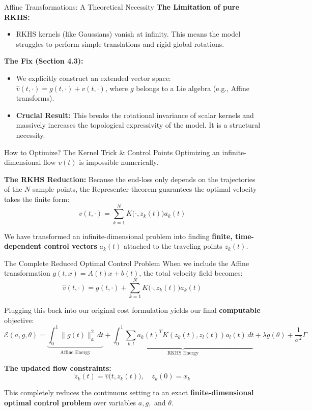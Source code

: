 \documentclass[aspectratio=169]{beamer}
\begin{document}
\begin{frame}{Affine Transformations: A Theoretical Necessity}
\textbf{The Limitation of pure RKHS:}
\begin{itemize}
  \item RKHS kernels (like Gaussians) vanish at infinity. This means the model struggles to perform simple translations and rigid global rotations.
\end{itemize}

\textbf{The Fix (Section 4.3):}
\begin{itemize}
  \item We explicitly construct an extended vector space: $\widehat{v}(t, \cdot) = g(t, \cdot) + v(t, \cdot)$, where $g$ belongs to a Lie algebra (e.g., Affine transforms).
  \item \textbf{Crucial Result:} This breaks the rotational invariance of scalar kernels and massively increases the topological expressivity of the model. It is a structural necessity.
\end{itemize}
\end{frame}



\begin{frame}{How to Optimize? The Kernel Trick \& Control Points}
Optimizing an infinite-dimensional flow $v(t)$ is impossible numerically.

\vspace{1mm}
\textbf{The RKHS Reduction:}
Because the end-loss only depends on the trajectories of the $N$ sample points, the Representer theorem guarantees the optimal velocity takes the finite form:
\[
v(t,\cdot)=\sum_{k=1}^{N} K\big(\cdot,z_k(t)\big) a_k(t)
\]

We have transformed an infinite-dimensional problem into finding \textbf{finite, time-dependent control vectors} $a_k(t)$ attached to the traveling points $z_k(t)$.
\end{frame}




\begin{frame}{The Complete Reduced Optimal Control Problem}
When we include the Affine transformation $g(t, x) = A(t)x + b(t)$, the total velocity field becomes:
\[
\widehat{v}(t,\cdot) = g(t,\cdot) + \sum_{k=1}^{N} K\big(\cdot,z_k(t)\big) a_k(t)
\]

Plugging this back into our original cost formulation yields our final \textbf{computable} objective:
\[
\mathcal{E}(a, g, \theta) = \underbrace{\int_0^1 \|g(t)\|_{\mathfrak{a}}^2 \,dt}_{\text{Affine Energy}} + \underbrace{\int_0^1 \sum_{k,l} a_k(t)^T K(z_k(t), z_l(t)) a_l(t) \,dt}_{\text{RKHS Energy}} + \lambda g(\theta) + \frac{1}{\sigma^2}\Gamma
\]

\vspace{1mm}
\textbf{The updated flow constraints:}
\[
\dot{z}_k(t) = \widehat{v}\big(t, z_k(t)\big), \quad z_k(0) = x_k
\]

This completely reduces the continuous setting to an exact \textbf{finite-dimensional optimal control problem} over variables $a, g,$ and $\theta$.
\end{frame}
\end{document}
